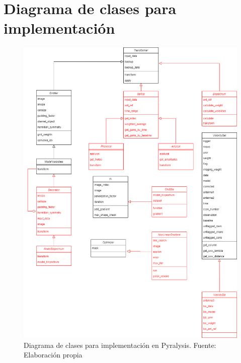 \chapter{Diagrama de clases para implementación}
\label{finales:apendice3}

\begin{figure}[!ht]
	\centering
	\captionsetup{justification=centering}
	\includegraphics[scale=0.4]{images/Pyralysis-All.png}
	\caption[Diagrama de clases para implementación en Pyralysis]{Diagrama de clases para implementación en Pyralysis. Fuente: Elaboración propia}
	\label{fig:pyralysis_all}
\end{figure}